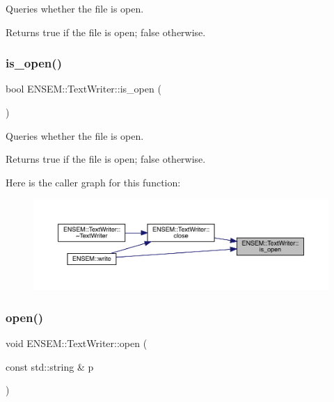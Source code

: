Queries whether the file is open. 

\begin{DoxyReturn}{Returns}
true if the file is open; false otherwise. 
\end{DoxyReturn}
\mbox{\label{classENSEM_1_1TextWriter_a6718d81018fe6a709f11cdb2f008c68b}} 
\subsubsection{\texorpdfstring{is\_open()}{is\_open()}\hspace{0.1cm}{\footnotesize\ttfamily [2/2]}}
{\footnotesize\ttfamily bool E\+N\+S\+E\+M\+::\+Text\+Writer\+::is\+\_\+open (\begin{DoxyParamCaption}{ }\end{DoxyParamCaption})}



Queries whether the file is open. 

\begin{DoxyReturn}{Returns}
true if the file is open; false otherwise. 
\end{DoxyReturn}
Here is the caller graph for this function\+:\nopagebreak
\begin{figure}[H]
\begin{center}
\leavevmode
\includegraphics[width=350pt]{db/d53/classENSEM_1_1TextWriter_a6718d81018fe6a709f11cdb2f008c68b_icgraph}
\end{center}
\end{figure}
\mbox{\label{classENSEM_1_1TextWriter_a8a7bdd80e930dd002d3af693e5a2cb95}} 
\subsubsection{\texorpdfstring{open()}{open()}\hspace{0.1cm}{\footnotesize\ttfamily [1/2]}}
{\footnotesize\ttfamily void E\+N\+S\+E\+M\+::\+Text\+Writer\+::open (\begin{DoxyParamCaption}\item[{const std\+::string \&}]{p }\end{DoxyParamCaption})}

